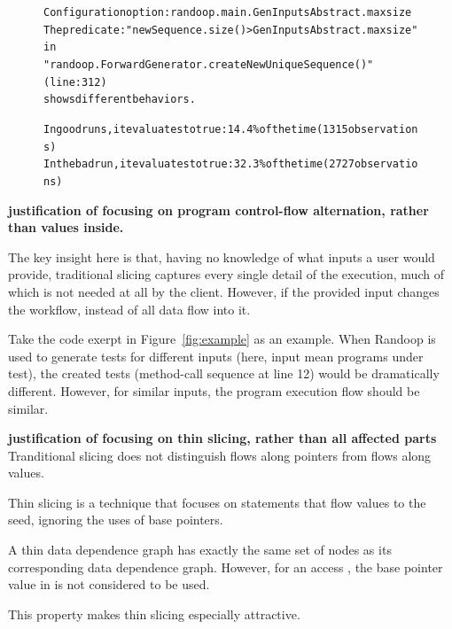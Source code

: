 \begin{figure}[t]
\begin{CodeOut}
\begin{alltt} 
Configuration option: randoop.main.GenInputsAbstract.maxsize
The predicate: "newSequence.size() > GenInputsAbstract.maxsize" in
"randoop.ForwardGenerator.createNewUniqueSequence()" (line: 312)
shows different behaviors.

In good runs, it evaluates to true:  14.4\% of the time (1315 observations)
In the bad run, it evaluates to true: 32.3\% of the time (2727 observations)

\end{alltt}
\end{CodeOut}
\vspace*{-15pt}
\end{figure}



\textbf{justification of focusing on program control-flow
alternation, rather than values inside.}

The key insight here is that, having no knowledge of
what inputs a user would provide, traditional slicing
captures every single detail of the execution, much
of which is not needed at all by the client.
However, if the provided input changes the workflow,
instead of all data flow into it. 

Take the code exerpt in Figure~\ref{fig:example} as an example.
When Randoop is used to generate tests for different inputs (here,
input mean programs under test), the created tests (method-call
sequence at line 12) would be dramatically different.
However, for similar inputs, the program execution flow should
be similar.

\textbf{justification of focusing on thin slicing, rather
than all affected parts}
Tranditional slicing does not distinguish flows along
pointers from flows along values.

Thin slicing is a technique that focuses on statements
that flow values to the seed, ignoring the uses of
base pointers.

A thin data dependence graph has exactly
the same set of nodes as its corresponding data dependence
graph. However, for an access , the base pointer value
in  is not considered to be used. 

This property makes thin slicing
especially attractive.

